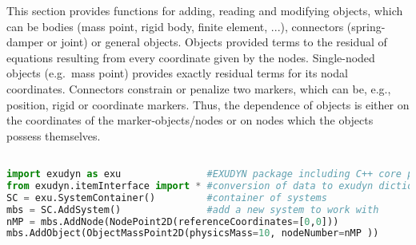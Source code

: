 This section provides functions for adding, reading and modifying objects, which can be bodies (mass point, rigid body, finite element, ...), connectors (spring-damper or joint) or general objects. Objects provided terms to the residual of equations resulting from every coordinate given by the nodes. Single-noded objects (e.g.~mass point) provides exactly residual terms for its nodal coordinates. Connectors constrain or penalize two markers, which can be, e.g., position, rigid or coordinate markers. Thus, the dependence of objects is either on the coordinates of the marker-objects/nodes or on nodes which the objects possess themselves.
\pythonstyle
\begin{lstlisting}[language=Python, firstnumber=1]

import exudyn as exu               #EXUDYN package including C++ core part
from exudyn.itemInterface import * #conversion of data to exudyn dictionaries
SC = exu.SystemContainer()         #container of systems
mbs = SC.AddSystem()               #add a new system to work with
nMP = mbs.AddNode(NodePoint2D(referenceCoordinates=[0,0]))
mbs.AddObject(ObjectMassPoint2D(physicsMass=10, nodeNumber=nMP ))
\end{lstlisting}

